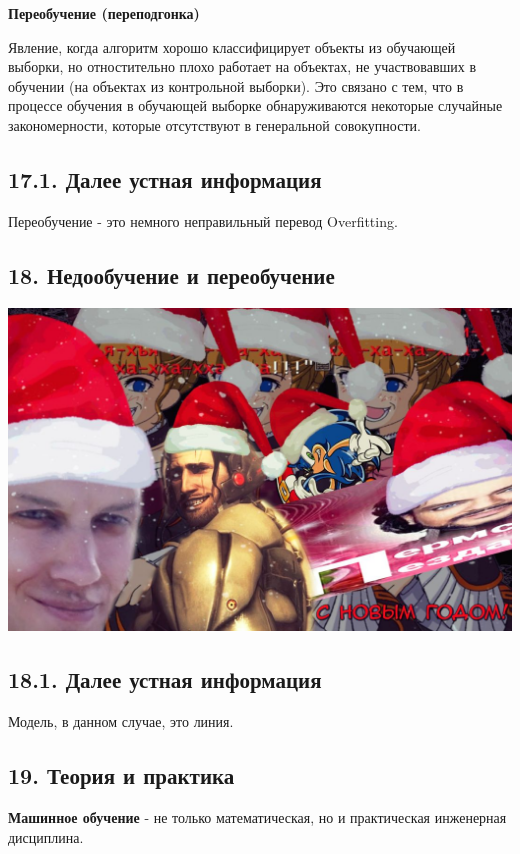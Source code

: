 \textbf{Переобучение (переподгонка)}

Явление, когда алгоритм хорошо классифицирует объекты из обучающей выборки,
но отностительно плохо работает на объектах, не участвовавших в обучении
(на объектах из контрольной выборки).
Это связано с тем, что в процессе обучения в обучающей выборке
обнаруживаются некоторые случайные закономерности, которые отсутствуют в
генеральной совокупности.

\subsection{17.1. Далее устная информация}

Переобучение - это немного неправильный перевод Overfitting.

\subsection{18. Недообучение и переобучение}

\includegraphics[scale=0.3]{figures/samplefigure.jpg}

\subsection{18.1. Далее устная информация}

Модель, в данном случае, это линия.

\subsection{19. Теория и практика}

\textbf{Машинное обучение} - не только математическая, но и практическая
инженерная дисциплина.

